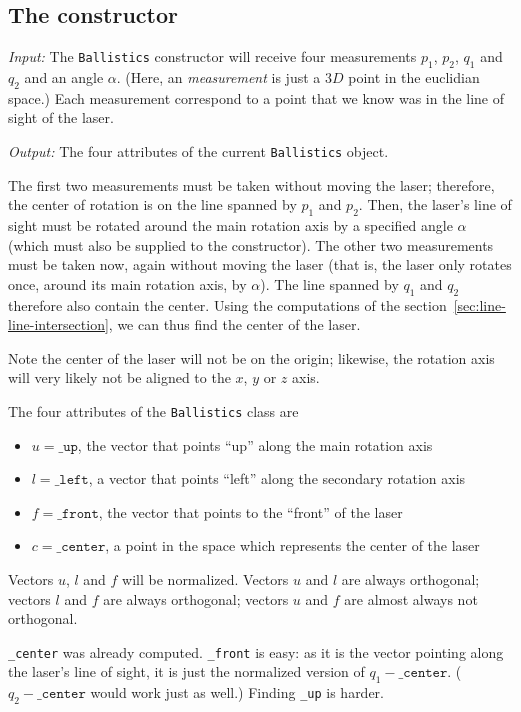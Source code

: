 \documentclass{article}
\newcommand\class[1]{\texttt{#1}}
\newcommand\attribute[1]{\texttt{#1}}
\begin{document}
\subsection{The constructor}

\emph{Input:}
The \class{Ballistics} constructor will receive four measurements
$p_1$, $p_2$, $q_1$ and $q_2$ and an angle $\alpha$.
(Here, an \emph{measurement} is just a $3D$ point in the euclidian space.)
Each measurement correspond to a point
that we know was in the line of sight of the laser.

\noindent \emph{Output:}
The four attributes of the current \class{Ballistics} object.

The first two measurements must be taken without moving the laser;
therefore, the center of rotation is on the line spanned by $p_1$ and $p_2$.
Then, the laser's line of sight must be rotated around the main rotation axis
by a specified angle $\alpha$ (which must also be supplied to the constructor).
The other two measurements must be taken now, again without moving the laser
(that is, the laser only rotates once, around its main rotation axis, by $\alpha$).
The line spanned by $q_1$ and $q_2$ therefore also contain the center.
Using the computations of the section~\ref{sec:line-line-intersection},
we can thus find the center of the laser.

Note the center of the laser will not be on the origin;
likewise, the rotation axis will very likely not be aligned to
the $x$, $y$ or $z$ axis.

The four attributes of the \class{Ballistics} class are
\begin{itemize}
    \item $u = \attribute{\_up}$,
        the vector that points ``up'' along the main rotation axis
    \item $l = \attribute{\_left}$,
        a vector that points ``left'' along the secondary rotation axis
    \item $f = \attribute{\_front}$,
        the vector that points to the ``front'' of the laser
    \item $c = \attribute{\_center}$,
        a point in the space which represents the center of the laser
\end{itemize}
Vectors $u$, $l$ and $f$ will be normalized.
Vectors $u$ and $l$ are always orthogonal;
vectors $l$ and $f$ are always orthogonal;
vectors $u$ and $f$ are almost always not orthogonal.

\attribute{\_center} was already computed.
\attribute{\_front} is easy: as it is the vector pointing along
the laser's line of sight,
it is just the normalized version of $q_1 - \attribute{\_center}$.
($q_2 - \attribute{\_center}$ would work just as well.)
Finding \attribute{\_up} is harder.
\end{document}
